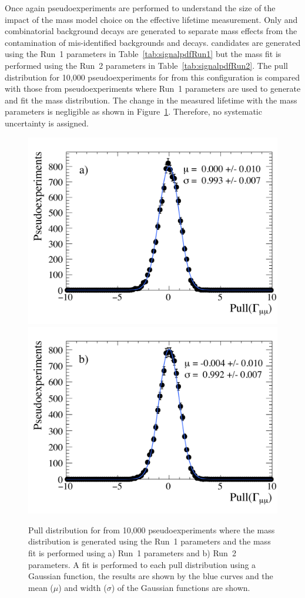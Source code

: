 Once again pseudoexperiments are performed to understand the size of the impact of the mass model choice on the effective lifetime measurement. Only \bsmumu and combinatorial background decays are generated to separate mass \pdf effects from the contamination of mis-identified backgrounds and \bdmumu decays. \bsmumu candidates are generated using the Run~1 parameters in Table~\ref{tab:signalpdfRun1} but the mass fit is performed using the Run~2 parameters in Table~\ref{tab:signalpdfRun2}. The pull distribution for 10,000 pseudoexperiments for \Gmumu from this configuration is compared with those from pseudoexperiments where Run~1 parameters are used to generate and fit the mass distribution. The change in the measured lifetime with the mass \pdf parameters is negligible as shown in Figure~\ref{fig:masspdfsyst}. Therefore, no systematic uncertainty is assigned. 

\begin{figure}[tbp]
    \centering
        \includegraphics[width=0.49 \textwidth]{./Figs/LifetimeSystematics/Gamma_pull_mass_pdf_Run1.pdf}
        \includegraphics[width=0.49 \textwidth]{./Figs/LifetimeSystematics/Gamma_pull_mass_pdf_Run2.pdf}
    \caption{Pull distribution for \Gmumu from 10,000 pseudoexperiments where the \bsmumu mass distribution is generated using the Run~1 parameters and the mass fit is performed using a) Run~1 parameters and b) Run~2 parameters. A fit is performed to each pull distribution using a Gaussian function, the results are shown by the blue curves and the mean ($\mu$) and width ($\sigma$) of the Gaussian functions are shown.}
    \label{fig:masspdfsyst}
\end{figure}


